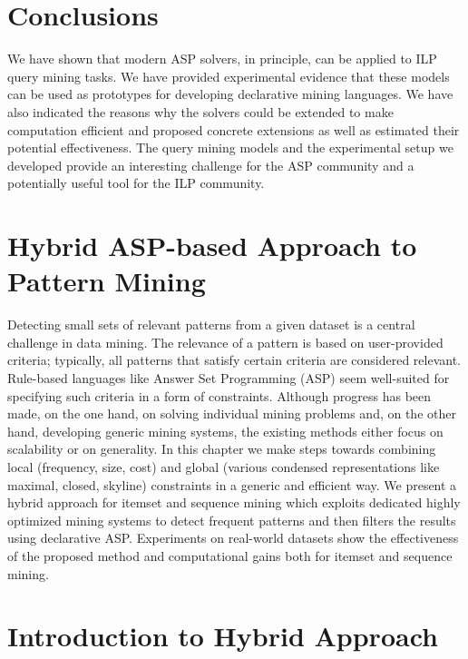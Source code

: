 \section{Conclusions}\label{sec:conclusions}
We have shown that modern ASP solvers, in principle, can be applied to ILP query mining tasks. We have provided experimental evidence that these models can be used as prototypes for developing declarative mining languages. We have also indicated the reasons why the solvers could be extended to make computation efficient and proposed concrete extensions as well as estimated their potential effectiveness. The query mining models and the experimental setup we developed provide an interesting challenge for the ASP community and a potentially useful tool for the ILP community.




\section{Hybrid ASP-based Approach to Pattern Mining}

  Detecting small sets of relevant patterns from a given dataset is a central challenge in data mining. The relevance of a pattern is based on user-provided criteria; typically, all patterns that satisfy certain criteria are considered relevant. Rule-based languages like Answer Set Programming (ASP) seem well-suited for specifying such criteria in a form of constraints.  Although progress has been made, on the one hand, on solving individual mining problems and, on the other hand, developing generic mining systems, the existing methods either focus on scalability or on generality.  In this chapter we make steps towards combining local (frequency, size, cost) and global (various condensed representations like maximal, closed, skyline) constraints in a generic and efficient way. We present a hybrid approach for itemset and sequence mining which exploits dedicated highly optimized mining systems to detect frequent patterns and then filters the results using declarative ASP. Experiments on real-world datasets show the effectiveness of the proposed method and computational gains both for itemset and sequence mining. 
 
\section{Introduction to Hybrid Approach}
